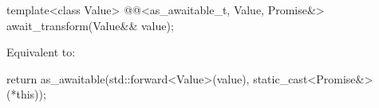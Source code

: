 %
\begin{itemdecl}
template<class Value>
@@<as_awaitable_t, Value, Promise&> await_transform(Value&& value);
\end{itemdecl}

\begin{itemdescr}
\pnum
\effects
Equivalent to:
\begin{codeblock}
return as_awaitable(std::forward<Value>(value), static_cast<Promise&>(*this));
\end{codeblock}
\end{itemdescr}
